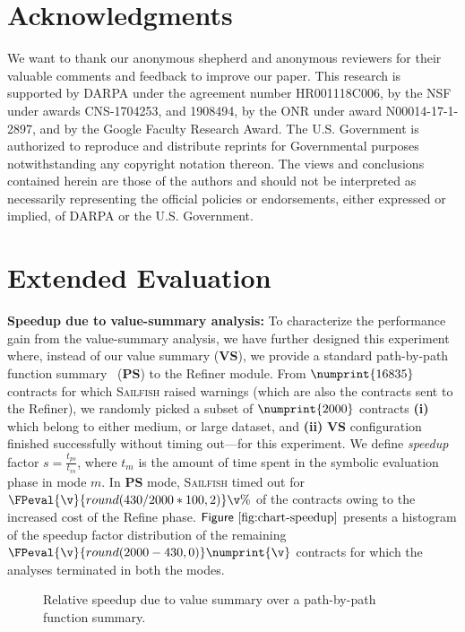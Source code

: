 \documentclass[conference, romanappendices]{tex/IEEEtran}
\theoremstyle{bfnote}
\newcommand{\toolname}{\textsc{Sailfish}\xspace}
\newcommand{\refine}{{\sc Refine}\xspace}
\newcommand{\refiner}{{\sc Refiner}\xspace}
\newcommand{\vsa}{{value-summary analysis}\xspace}
\let\num\numprint
\newcommand{\Fig}[1]{\ensuremath{\sf Figure~\ref{#1}}}
\newcommand{\clintStaticOnlyWarnings}{16835}
\newcommand{\clintSpeedupDataset}{2000}
\newcommand{\clintPathSummaryTimeout}{430}
\begin{document}
 	\section{Acknowledgments}
\label{sec:acknowledgement}
We want to thank our anonymous shepherd and anonymous reviewers for their valuable comments and feedback to improve our paper.
This research is supported by DARPA under the agreement number HR001118C006, by the NSF under awards CNS-1704253, and 1908494, by the ONR under award N00014-17-1-2897, and by the Google Faculty Research Award.
The U.S. Government is authorized to reproduce and distribute {reprints\EndAccSupp{}} for Governmental purposes notwithstanding any copyright notation thereon.
The views and conclusions contained herein are those of the authors
and should not be interpreted as necessarily representing the official policies or {endorsements\EndAccSupp{}}, either expressed or implied, of DARPA or the U.S. Government. 	
	
	 
	\appendices


\section{Extended Evaluation}
\label{app:extended_evaluation}
\noindent
\textbf{Speedup due to \vsa:}
To characterize the performance gain from the \vsa, we have further designed this experiment where, instead of our value summary (\textbf{VS}), we provide a standard path-by-path function summary~\cite{solar,Godefroid07,AnandGT08} (\textbf{PS}) to the \refiner module.
From $\num{\clintStaticOnlyWarnings}$ contracts for which \toolname raised warnings (which are also the contracts sent to the \refiner), we randomly picked a subset of $\num{\clintSpeedupDataset}$ contracts 
\textbf{(i)} which belong to either medium, or large dataset, and 
\textbf{(ii)} \textbf{VS} configuration finished successfully without timing out---for this experiment.
We define \textit{speedup} factor $s = \frac{t_{ps}}{t_{vs}}$, where $t_m$ is the amount of time spent in the symbolic evaluation phase in mode $m$.
In \textbf{PS} mode, \toolname timed out for $\FPeval{\v}{round(\clintPathSummaryTimeout/\clintSpeedupDataset*100,2)}\v\%$ of the contracts {owing\EndAccSupp{}} to the increased cost of the \refine phase.
\Fig{fig:chart-speedup} presents a histogram of the speedup factor distribution of the remaining $\FPeval{\v}{round(\clintSpeedupDataset-\clintPathSummaryTimeout,0)}\num{\v}$ contracts for which the analyses terminated in both the modes.
\begin{figure}[!t]
	\centering
	\setlength{\fboxsep}{0pt}\setlength{\fboxrule}{0.5pt}
	\caption{\small Relative speedup due to value summary over a path-by-path function summary.
	}
	\label{fig:chart-speedup}
	\vspace{-7mm}
\end{figure}
\end{document}
